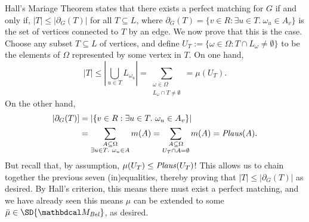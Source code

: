 \begin{lproof}
    Hall's Mariage Theorem states that there exists a perfect matching
    for $G$ if and only if, $|T| \le  |\partial_G(T)|$ for all $T \subseteq L$,
    where $\partial_G(T) = \{ v \in R : \exists u \in T.~\omega_u \in A_v\}$ is the set of vertices connected to $T$ by an edge. 
    We now prove that this is the case.
    Choose any subset $T \subseteq L$ of vertices, and define $U_T := \{ \omega \in \Omega : T \cap L_\omega \ne \emptyset \}$ to be the elements of $\Omega$ represented by some vertex in $T$. 
    On one hand,
    \[ 
        |T| \le | \bigcup_{u \in T} L_{\omega_u} | 
            =  \sum_{\substack{\omega \in \Omega \\ L_\omega \cap T \ne\emptyset }}
            = \mu(U_T).
    \]
    On the other hand, 
    \begin{align*}
        |\partial_G(T)] &=  |\{ v \in R : \exists u \in T.~\omega_u \in A_v \}| \\
            &= \sum_{\substack{A \subseteq \Omega \\ \exists u \in T.~ \omega_u \in A}} m(A)
            = \sum_{\substack{A \subseteq \Omega \\ U_T \cap A = \emptyset}} m(A)
            = \mathit{Plaus}(A).  
    \end{align*}
    But recall that, by assumption, $\mu(U_T) \le \mathit{Plaus}(U_T)$! This allows us to 
    chain together the previous seven (in)equalities, thereby proving that $|T| \le |\partial_G(T)|$ as desired.
    By Hall's criterion, this means there must exist a perfect matching, and we have already seen this means $\mu$ can be extended to some $\bar\mu \in \SD{\dg M_{\Bel}}$, as desired.

\end{lproof}
